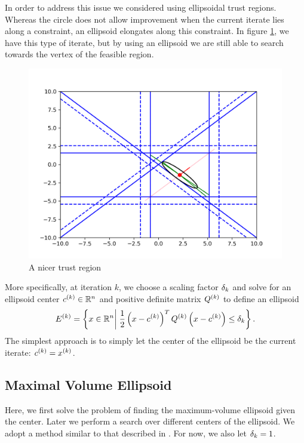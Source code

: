 In order to address this issue we considered using ellipsoidal trust regions.
Whereas the circle does not allow improvement when the current iterate lies along a constraint, an ellipsoid elongates along this constraint.
In figure \cref{ellipse_adv}, we have this type of iterate, but by using an ellipsoid we are still able to search towards the vertex of the feasible region.
\begin{figure}[ht]
    \centering
    \includegraphics[scale=0.4]{images/advantage_of_ellipse_2.png}
    \caption{A nicer trust region}
    \label{ellipse_adv}
\end{figure}


More specifically, at iteration $k$, we choose a scaling factor ${\delta_k}$ and solve for an ellipsoid center ${c^{(k)}} \in \mathbb R^n$ and positive definite matrix ${Q^{(k)}}$ to define an ellipsoid
\begin{align*}
{E^{(k)}} = \left\{x \in \mathbb R^n \bigg| \; \frac 1 2 \left(x - {c^{(k)}}\right)^T{Q^{(k)}}\left(x - {c^{(k)}}\right) \le {\delta_k} \right\}.
\end{align*}
The simplest approach is to simply let the center of the ellipsoid be the current iterate: ${c^{(k)}} = x^{(k)}$.


\subsection{Maximal Volume Ellipsoid}

\label{ellipse_optimization}

Here, we first solve the problem of finding the maximum-volume ellipsoid given the center.
Later we perform a search over different centers of the ellipsoid.
We adopt a method similar to that described in \cite{Khachiyan1993}.
For now, we also let ${\delta_k} = 1$.

